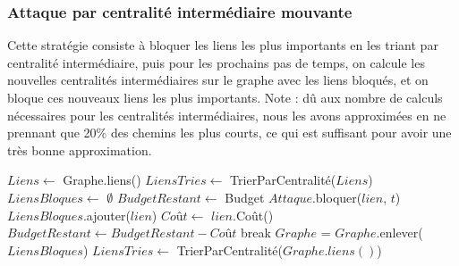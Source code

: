 \subsubsection{Attaque par centralité intermédiaire mouvante}\label{subsubsec:attaque_centralite_intermediaire_mouvante}

Cette stratégie consiste à bloquer les liens les plus importants en les triant par centralité intermédiaire, puis pour les prochains pas de temps, on calcule les nouvelles centralités intermédiaires sur le graphe avec les liens bloqués, et on bloque ces nouveaux liens les plus importants.
Note : dû aux nombre de calculs nécessaires pour les centralités intermédiaires, nous les avons approximées en ne prennant que 20\% des chemins les plus courts, ce qui est suffisant pour avoir une très bonne approximation.

\begin{algorithm}[H]
\caption{Attaque par centralité intermédiaire mouvante}
\begin{algorithmic}
\State $Liens \gets$ Graphe.liens()
\State $LiensTries \gets$ TrierParCentralité($Liens$)
\State $LiensBloques \gets$ $\emptyset$
\State $BudgetRestant \gets$ Budget
\State $Attaque$.bloquer($lien$, $t$)
\State $LiensBloques$.ajouter($lien$)
\State $Coût \gets$ $lien$.Coût()
\State $BudgetRestant \gets BudgetRestant - Coût$
\State break
\EndIf
\EndFor
\State $Graphe$ = $Graphe$.enlever($LiensBloques$)
\State $LiensTries \gets$ TrierParCentralité($Graphe.liens()$)
\EndFor
\end{algorithmic}
\end{algorithm}
